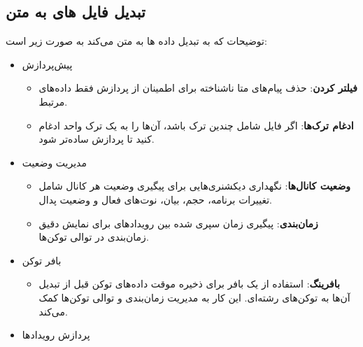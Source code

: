 \subsection{تبدیل فایل های  به متن}

توضیحات  که به تبدیل داده ها به متن می‌کند به صورت زیر است:
\begin{itemize}
      \item {پیش‌پردازش}
            \begin{itemize}
                  \item
                        \textbf{فیلتر کردن}: حذف پیام‌های متا ناشناخته برای اطمینان از پردازش
                        فقط داده‌های  مرتبط.
                  \item
                        \textbf{ادغام ترک‌ها}: اگر فایل  شامل چندین ترک باشد، آن‌ها را به یک
                        ترک واحد ادغام کنید تا پردازش ساده‌تر شود.
            \end{itemize}

      \item {مدیریت وضعیت}

            \begin{itemize}

                  \item
                        \textbf{وضعیت کانال‌ها}: نگهداری دیکشنری‌هایی برای پیگیری وضعیت هر کانال
                         شامل تغییرات برنامه، حجم، بیان، نوت‌های فعال و وضعیت پدال.
                  \item
                        \textbf{زمان‌بندی}: پیگیری زمان سپری شده بین رویدادهای  برای نمایش
                        دقیق زمان‌بندی در توالی توکن‌ها.
            \end{itemize}

      \item {بافر  توکن}

            \begin{itemize}

                  \item
                        \textbf{بافرینگ}: استفاده از یک بافر برای ذخیره موقت داده‌های توکن قبل
                        از تبدیل آن‌ها به توکن‌های رشته‌ای. این کار به مدیریت زمان‌بندی و توالی
                        توکن‌ها کمک می‌کند.
            \end{itemize}

      \item {پردازش رویدادها}

            \begin{itemize}


\end{itemize}
\end{itemize}
